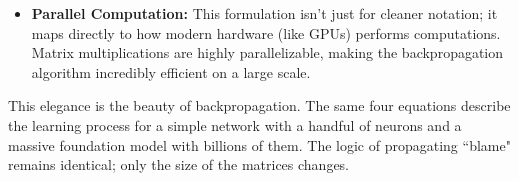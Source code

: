 \documentclass{article}
\begin{document}
\begin{itemize}
    Multiplying a column vector by a row vector yields a matrix:
    $$ \underset{(m \times 1)}{\delta^{(l)}} \underset{(1 \times n)}{(a^{(l-1)})^T} = 
       \begin{bmatrix} \delta_1^{(l)} \\ \delta_2^{(l)} \\ \vdots \\ \delta_m^{(l)} \end{bmatrix}
       \begin{bmatrix} a_1^{(l-1)} & a_2^{(l-1)} & \cdots & a_n^{(l-1)} \end{bmatrix}
       =
       \underset{(m \times n)}{\begin{bmatrix}
       \delta_1^{(l)} a_1^{(l-1)} & \delta_1^{(l)} a_2^{(l-1)} & \cdots & \delta_1^{(l)} a_n^{(l-1)} \\
       \delta_2^{(l)} a_1^{(l-1)} & \delta_2^{(l)} a_2^{(l-1)} & \cdots & \delta_2^{(l)} a_n^{(l-1)} \\
       \vdots & \vdots & \ddots & \vdots \\
       \delta_m^{(l)} a_1^{(l-1)} & \delta_m^{(l)} a_2^{(l-1)} & \cdots & \delta_m^{(l)} a_n^{(l-1)}
       \end{bmatrix}}
    $$
    The resulting $m \times n$ matrix has the exact same dimensions as the weight matrix $W^{(l)}$. Each element $(i,j)$ of this matrix correctly represents $\frac{\partial L}{\partial W_{ij}^{(l)}}$, which is the blame from neuron $i$ multiplied by the activation from neuron $j$ that fed into it.

    \item \textbf{Parallel Computation:} This formulation isn't just for cleaner notation; it maps directly to how modern hardware (like GPUs) performs computations. Matrix multiplications are highly parallelizable, making the backpropagation algorithm incredibly efficient on a large scale.
\end{itemize}

This elegance is the beauty of backpropagation. The same four equations describe the learning process for a simple network with a handful of neurons and a massive foundation model with billions of them. The logic of propagating ``blame" remains identical; only the size of the matrices changes.
\end{document}
